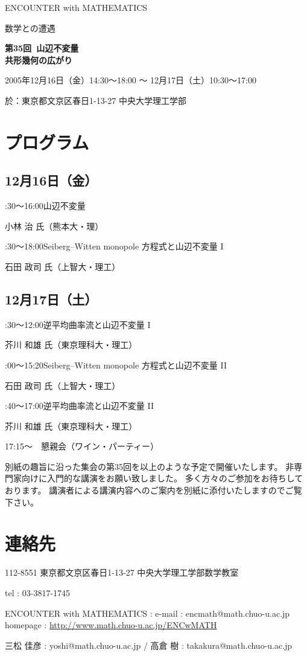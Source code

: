 \documentclass[uplatex,dvipdfmx]{jlreq}
\newcommand{\talk}[3]{%
\noindent
#1\quad #2\par
\hspace*{2em}#3\par\smallskip
}
\newcommand{\EwMnumber}{第35回}
\newcommand{\EwMtitle}{山辺不変量\\[2mm]\large 共形幾何の広がり}
\newcommand{\EwMdate}{2005年12月16日（金）14:30～18:00 ～ 12月17日（土）10:30～17:00}
\newcommand{\EwMplace}{東京都文京区春日1-13-27 中央大学理工学部}
\newcommand{\EwMtitleblock}{

\vspace*{-5mm}

\begin{center}

{\Large ENCOUNTER with MATHEMATICS}

\vspace{2mm}

{\large 数学との遭遇}

\vspace{4mm}

{\Large \bfseries \EwMnumber\ \EwMtitle}

\vspace{4mm}

\EwMdate

\vspace{2mm}

於：\EwMplace

\end{center}

\vspace{2mm}

}
\begin{document}
\EwMtitleblock


\section*{プログラム}

\subsection*{12月16日（金）}

\talk
{14:30～16:00}
{山辺不変量}
{小林 治 氏（熊本大・理）}

\talk
{16:30～18:00}
{Seiberg–Witten monopole 方程式と山辺不変量 I}
{石田 政司 氏（上智大・理工）}

\subsection*{12月17日（土）}

\talk
{10:30～12:00}
{逆平均曲率流と山辺不変量 I}
{芥川 和雄 氏（東京理科大・理工）}

\talk
{14:00～15:20}
{Seiberg–Witten monopole 方程式と山辺不変量 II}
{石田 政司 氏（上智大・理工）}

\talk
{15:40～17:00}
{逆平均曲率流と山辺不変量 II}
{芥川 和雄 氏（東京理科大・理工）}

\bigskip

17:15～　懇親会（ワイン・パーティー）


\bigskip

別紙の趣旨に沿った集会の第35回を以上のような予定で開催いたします。  
非専門家向けに入門的な講演をお願い致しました。  
多く方々のご参加をお待ちしております。  
講演者による講演内容へのご案内を別紙に添付いたしますのでご覧下さい。


\section*{連絡先}

112-8551 東京都文京区春日1-13-27 中央大学理工学部数学教室 

tel : 03-3817-1745  

ENCOUNTER with MATHEMATICS : e-mail : encmath@math.chuo-u.ac.jp  
homepage : \url{http://www.math.chuo-u.ac.jp/ENCwMATH}  

三松 佳彦 : yoshi@math.chuo-u.ac.jp / 高倉 樹 : takakura@math.chuo-u.ac.jp
\end{document}
